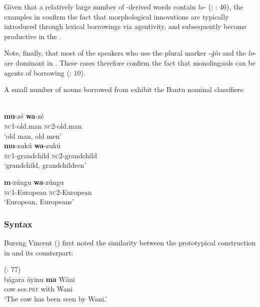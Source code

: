 \documentclass[output=paper]{langsci/langscibook}
\begin{document}
Given that a relatively large number of -derived words contain \textit{lo-} (\citealt{Miller1989}; \citealt{Manfredi2017}: 46), the examples in  confirm the fact that morphological innovations are typically introduced through lexical borrowings via  agentivity, and subsequently become productive in the . 

Note, finally, that most of the speakers who use the plural marker -\textit{ǧín} and the  \textit{lo}{}- are dominant in  . These cases therefore confirm the fact that  monolinguals can be agents of borrowing (\citealt{VanCoetsem1988}: 10).

A small number of  nouns borrowed from  exhibit the Bantu nominal classifiers:

\ea

{ \citep[57]{Wellens2003}}\\
 
\ea\textbf{mu}-zé               \textbf{wa}-zé\\
 
{\textsc{nc}1-old.man   \textsc{nc2}-old.man}\\
 {`old man, old men'}\\
 
\ex
\gll  \textbf{mu}-zukú \textbf{wa}-zukú\\
          \textsc{nc}1-grandchild   \textsc{nc}2-grandchild\\
\glt       `grandchild, grandchildren'

\ex
\gll \textbf{m}-zúngu \textbf{wa}-zúngu\\
         \textsc{nc}1-European   \textsc{nc}2-European\\
\glt       `European, Europeans'
\z
\z

 \subsubsection{Syntax}

Bureng Vincent (\citeyear[77]{BurengVincent1986}) first noted the similarity between the prototypical  construction in   and its  counterpart:


\ea
{  (\citealt{BurengVincent1986}: 77)}\\
\ea\gll  bágara áyinu \textbf{ma} Wáni\\
        cow see.\textsc{pst} with Wani\\
\glt      `The cow has been seen by Wani.'
\end{document}
